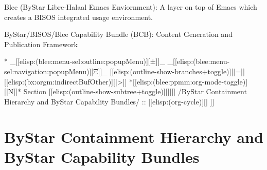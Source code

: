 \begin{whenOrg}
\begin{verblatex}
\begin{frame}[fragile,plain,label=lcntCapability]
    \begin{block}{Blee (ByStar Libre-Halaal Emacs Enviornment):}
           A layer on top of Emacs which creates a BISOS integrated usage environment.
    \end{block}

    \begin{exampleblock}{ByStar/BISOS/Blee Capability Bundle (BCB):}
          Content Generation and Publication Framework
    \end{exampleblock}



\end{frame}
\end{verblatex}



\begin{whenOrg}
*  _[[elisp:(blee:menu-sel:outline:popupMenu)][±]]_ _[[elisp:(blee:menu-sel:navigation:popupMenu)][Ξ]]_ [[elisp:(outline-show-branches+toggle)][|=]] [[elisp:(bx:orgm:indirectBufOther)][|>]] *[[elisp:(blee:ppmm:org-mode-toggle)][|N]]*  Section    [[elisp:(outline-show-subtree+toggle)][||]]   /ByStar Containment Hierarchy and ByStar Capability Bundles/ ::  [[elisp:(org-cycle)][| ]]
\end{whenOrg}

\section{ByStar Containment Hierarchy and ByStar Capability Bundles}


\end{whenOrg}
